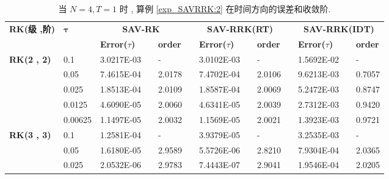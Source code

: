 			
\begin{table}[H]\scriptsize
	\centering
	\caption{当 $N=4 , T = 1$ 时 , 算例 \ref{exp_SAVRRK:2}  在时间方向的误差和收敛阶.}
	\begin{tabular}{lllllrlrlrlrlrl}
	\toprule
	\multicolumn{2}{l}{\multirow{2}[3]{*}{\textbf{RK(级 ,阶)}}} & \multicolumn{2}{l}{\multirow{2}[3]{*}{$\bm{\tau}$}} & \multicolumn{3}{c}{\textbf{SAV-RK}} &       & \multicolumn{3}{c}{\textbf{SAV-RRK(RT)}} &       & \multicolumn{3}{c}{\textbf{SAV-RRK(IDT)}} \\
	\cmidrule{5-7}\cmidrule{9-11}\cmidrule{13-15}    \multicolumn{2}{l}{} & \multicolumn{2}{l}{} & \textbf{Error($\tau$)} &       & \textbf{order} &       & \textbf{Error($\tau$)} &       & \textbf{order} &       & \textbf{Error($\tau$)} &       & \textbf{order} \\
	\hline
	\multicolumn{2}{l}{\multirow{5}[0]{*}{\textbf{RK(2 , 2)}}} & \multicolumn{2}{l}{0.1} & 3.0217E-03 &       &-    &       & 3.0102E-03 &       &-    &       & 1.5692E-02 &       &-\\
	\multicolumn{2}{l}{} & \multicolumn{2}{l}{0.05} & 7.4615E-04 &       & 2.0178  &       & 7.4702E-04 &       & 2.0106  &       & 9.6213E-03 &       & 0.7057  \\
	\multicolumn{2}{l}{} & \multicolumn{2}{l}{0.025} & 1.8513E-04 &       & 2.0109  &       & 1.8587E-04 &       & 2.0069  &       & 5.2472E-03 &       & 0.8747  \\
	\multicolumn{2}{l}{} & \multicolumn{2}{l}{0.0125} & 4.6090E-05 &       & 2.0060  &       & 4.6341E-05 &       & 2.0039  &       & 2.7312E-03 &       & 0.9420  \\
	\multicolumn{2}{l}{} & \multicolumn{2}{l}{0.00625} & 1.1497E-05 &       & 2.0032  &       & 1.1569E-05 &       & 2.0021  &       & 1.3923E-03 &       & 0.9721  \\
	\multicolumn{2}{l}{\multirow{5}[0]{*}{\textbf{RK(3 , 3)}}} & \multicolumn{2}{l}{0.1} & 1.2581E-04 &       &-    &       & 3.9379E-05 &       &-    &       & 3.2535E-03 &       &-\\
	\multicolumn{2}{l}{} & \multicolumn{2}{l}{0.05} & 1.6180E-05 &       & 2.9589  &       & 5.5726E-06 &       & 2.8210  &       & 7.9304E-04 &       & 2.0365  \\
	\multicolumn{2}{l}{} & \multicolumn{2}{l}{0.025} & 2.0532E-06 &       & 2.9783  &       & 7.4443E-07 &       & 2.9041  &       & 1.9546E-04 &       & 2.0205  \\

\end{tabular}
\end{table}
